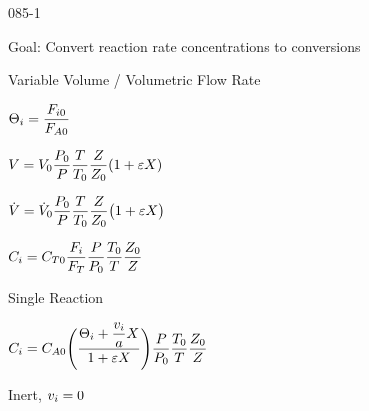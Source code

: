 \begin{mitframe}{085-1}

        
\begin{listone}

		\item Goal: Convert reaction rate concentrations to conversions
        
        \item Variable Volume / Volumetric Flow Rate
        
        \begin{listtwo}
        
        	\item $\dimltemp_{\state}=\dfrac{\force_{\state{0}}}{\force_{\helmholtz{0}}}$
            
            \item $\vol=\vol_0\dfrac{\p_0}{\p}\dfrac{\Temp}{\Temp_0}\dfrac{\compress}{\compress_0}(1+\varepsilon{X})$
            
            \item $\dot{\vol}=\dot{\vol}_0\dfrac{\p_0}{\p}\dfrac{\Temp}{\Temp_0}\dfrac{\compress}{\compress_0}\big(1+\varepsilon{X}\big)$
            
            \item $\conc_{\state}=\conc_{\Temp{0}}\dfrac{\force_{\state}}{\force_{\Temp}}\dfrac{\p}{\p_0}\dfrac{\Temp_0}{\Temp}\dfrac{\compress_0}{\compress}$
            
            		\begin{listthree}
                    
                    		\item Single Reaction
                            
                            \begin{listfour}
                            
                            	\item $\conc_{\state}=\conc_{\helmholtz{0}}\Bigg(\dfrac{\dimltemp_{\state}+\dfrac{\vvel_{\state}}{\activity}X}{1+\varepsilon{X}}\Bigg)\dfrac{\p}{\p_0}\dfrac{\Temp_0}{\Temp}\dfrac{\compress_0}{\compress}$
                                
                                \begin{listfive}
                                
                                		\item Inert, $\vvel_{\state}=0$
                                

\end{listfive}
\end{listfour}
\end{listthree}
\end{listtwo}
\end{listone}
\end{mitframe}
